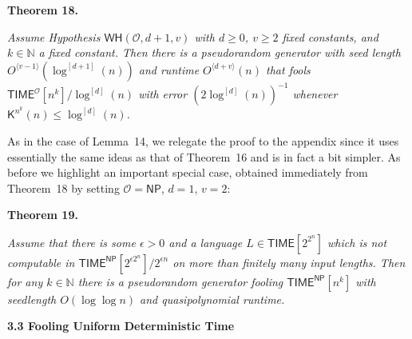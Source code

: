 

\par\medskip\noindent\textbf{
\textbf{Theorem 18}\textbf{.}
}\par



\emph{Assume Hypothesis $\mathsf{WH}(\mathcal{O},d+1,v)$ with $d\geq 0$, $v\geq 2$ fixed constants, and $k\in\mathbb{N}$ a fixed constant. Then there is a pseudorandom generator with seed length $O^{\langle v-1\rangle}(\log^{[d+1]}(n))$ and runtime $O^{\langle d+v\rangle}(n)$ that fools ${\mathsf{TIME}}^{\mathcal{O}}[n^{k}]/\log^{[d]}(n)$ with error $(2\log^{[d]}(n))^{-1}$ whenever ${\mathsf{K}}^{n^{k}}(n)\leq\log^{[d]}(n)$.}\par






As in the case of Lemma 14, we relegate the proof to the appendix since it uses essentially the same ideas as that of Theorem 16 and is in fact a bit simpler. As before we highlight an important special case, obtained immediately from Theorem 18 by setting $\mathcal{O}={\mathsf{NP}}$, $d=1$, $v=2$:\par





\par\medskip\noindent\textbf{
\textbf{Theorem 19}\textbf{.}
}\par



\emph{Assume that there is some $\epsilon>0$ and a language $L\in{\mathsf{TIME}}[2^{2^{n}}]$ which is not computable in ${\mathsf{TIME}}^{\mathsf{NP}}[2^{\epsilon 2^{n}}]/2^{\epsilon n}$ on more than finitely many input lengths. Then for any $k\in\mathbb{N}$ there is a pseudorandom generator fooling ${\mathsf{TIME}}^{\mathsf{NP}}[n^{k}]$ with seedlength $O(\log\log n)$ and quasipolynomial runtime.}\par








\par\medskip\noindent\textbf{
3.3 Fooling Uniform Deterministic Time }\par




